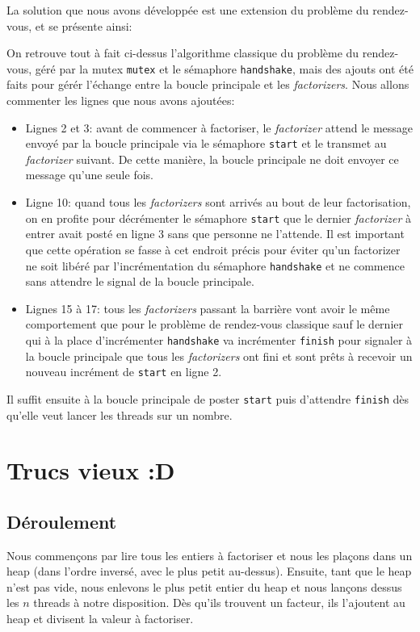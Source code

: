 \documentclass[a4paper,10pt]{article}
\begin{document}
La solution que nous avons développée est une extension du problème du rendez-vous, et se présente ainsi:


On retrouve tout à fait ci-dessus l'algorithme classique du problème du rendez-vous, géré par la mutex \texttt{mutex} et le sémaphore \texttt{handshake}, mais des ajouts ont été faits pour gérér l'échange entre la boucle principale et les \emph{factorizers}. Nous allons commenter les lignes que nous avons ajoutées:
\begin{itemize}
    \item Lignes 2 et 3: avant de commencer à factoriser, le \emph{factorizer} attend le message envoyé par la boucle principale via le sémaphore \texttt{start} et le transmet au \emph{factorizer} suivant. De cette manière, la boucle principale ne doit envoyer ce message qu'une seule fois.
    \item Ligne 10: quand tous les \emph{factorizers} sont arrivés au bout de leur factorisation, on en profite pour décrémenter le sémaphore \texttt{start} que le dernier \emph{factorizer} à entrer avait posté en ligne 3 sans que personne ne l'attende. Il est important que cette opération se fasse à cet endroit précis pour éviter qu'un factorizer ne soit libéré par l'incrémentation du sémaphore \texttt{handshake} et ne commence sans attendre le signal de la boucle principale.
    \item Lignes 15 à 17: tous les \emph{factorizers} passant la barrière vont avoir le même comportement que pour le problème de rendez-vous classique sauf le dernier qui à la place d'incrémenter \texttt{handshake} va incrémenter \texttt{finish} pour signaler à la boucle principale que tous les \emph{factorizers} ont fini et sont prêts à recevoir un nouveau incrément de \texttt{start} en ligne 2.
\end{itemize}

Il suffit ensuite à la boucle principale de poster \texttt{start} puis d'attendre \texttt{finish} dès qu'elle veut lancer les threads sur un nombre.

\newpage
\section*{Trucs vieux :D}

\subsection*{Déroulement}

Nous commençons par lire tous les entiers à factoriser et nous les plaçons dans un heap (dans l'ordre inversé, avec le plus petit au-dessus). Ensuite, tant que le heap n'est pas vide, nous enlevons le plus petit entier du heap et nous lançons dessus les $n$ threads à notre disposition. Dès qu'ils trouvent un facteur, ils l'ajoutent au heap et divisent la valeur à factoriser.
\end{document}
